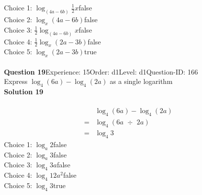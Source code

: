 \documentclass{article}
\begin{document}
Choice 1: \hspace{20pt}$\log_{(4a-6b)}\displaystyle\frac{1}{2}x$\hspace{20pt}false\\
Choice 2: \hspace{20pt}$\log_{x}(4a-6b)$\hspace{20pt}false\\
Choice 3: \hspace{20pt}$\displaystyle\frac{1}{2}\log_{(4a-6b)}x$\hspace{20pt}false\\
Choice 4: \hspace{20pt}$\displaystyle\frac{1}{2}\log_{x}(2a-3b)$\hspace{20pt}false\\
Choice 5: \hspace{20pt}$\log_{x}(2a-3b)$\hspace{20pt}true\\
\\[4pt]
\noindent\textbf{Question 19}\hspace{20pt}Experience: 15\hspace{20pt}Order: d1\hspace{20pt}Level: d1\hspace{20pt}Question-ID: 166\\[2pt]
Express $\log_{4}(6a)-\log_{4}(2a)$ as a single logarithm\\[4pt]
\noindent\textbf{Solution 19}\\[2pt]
\\[-35pt]\begin{align*}
&\log_{4}(6a)-\log_{4}(2a)\\[2pt]
=&\log_{4}(6a \,\, \div \,\, 2a)\\[2pt]
=&\log_{4}3
\end{align*}
Choice 1: \hspace{20pt}$\log_{a}2$\hspace{20pt}false\\
Choice 2: \hspace{20pt}$\log_{a}3$\hspace{20pt}false\\
Choice 3: \hspace{20pt}$\log_{4}3a$\hspace{20pt}false\\
Choice 4: \hspace{20pt}$\log_{4}12a^2$\hspace{20pt}false\\
Choice 5: \hspace{20pt}$\log_{4}3$\hspace{20pt}true\\
\end{document}
